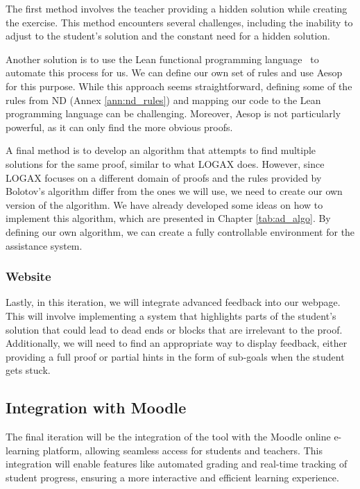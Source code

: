 The first method involves the teacher providing a hidden solution while creating the exercise. This method encounters several challenges, including the inability to adjust to the student's solution and the constant need for a hidden solution.

Another solution is to use the Lean functional programming language~\cite{programming} to automate this process for us. We can define our own set of rules and use Aesop~\cite{leanprovercommunity_2021_github} for this purpose. While this approach seems straightforward, defining some of the rules from \gls{ND} (Annex \ref{ann:nd_rules}) and mapping our code to the Lean programming language can be challenging. Moreover, Aesop is not particularly powerful, as it can only find the more obvious proofs.

A final method is to develop an algorithm that attempts to find multiple solutions for the same proof, similar to what LOGAX does. However, since LOGAX focuses on a different domain of proofs and the rules provided by Bolotov's algorithm differ from the ones we will use, we need to create our own version of the algorithm. We have already developed some ideas on how to implement this algorithm, which are presented in Chapter \ref{tab:ad_algo}. By defining our own algorithm, we can create a fully controllable environment for the assistance system.

\subsubsection{Website}
Lastly, in this iteration, we will integrate advanced feedback into our webpage. This will involve implementing a system that highlights parts of the student's solution that could lead to dead ends or blocks that are irrelevant to the proof. Additionally, we will need to find an appropriate way to display feedback, either providing a full proof or partial hints in the form of sub-goals when the student gets stuck.

\subsection{Integration with Moodle}
The final iteration will be the integration of the tool with the Moodle online e-learning platform, allowing seamless access for students and teachers. This integration will enable features like automated grading and real-time tracking of student progress, ensuring a more interactive and efficient learning experience.

